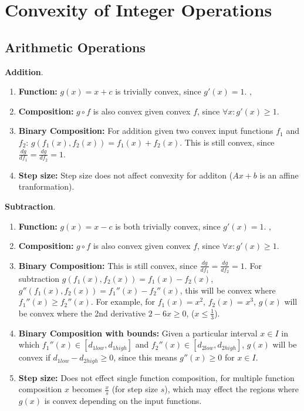 \documentclass[11pt]{article}
\theoremstyle{definition}
\begin{document}
\section{Convexity of Integer Operations}
\subsection{Arithmetic Operations}

\textbf{Addition}. 
\begin{enumerate}
\item \textbf{Function:} $g(x) = x + c$ is trivially convex, since $g'(x) = 1$. , 
\item \textbf{Composition:}  $g \circ f$ is also convex given convex $f$, since $\forall x: g'(x) \geq 1$.
\item \textbf{Binary Composition:} For addition given two convex input functions $f_1$ and $f_2$: $g(f_1(x), f_2(x)) = f_1(x) + f_2(x)$. This is still convex, since $\frac{dg}{df_1} = \frac{dg}{df_2} = 1$. 
\item \textbf{Step size:} Step size does not affect convexity for additon ($Ax + b$ is an affine tranformation).
\end{enumerate}

\textbf{Subtraction}. 
\begin{enumerate}
\item \textbf{Function:} $g(x) = x - c$ is both trivially convex, since $g'(x) = 1$. , 
\item \textbf{Composition:}  $g \circ f$ is also convex given convex $f$, since $\forall x: g'(x) \geq 1$.
\item \textbf{Binary Composition:} This is still convex, since $\frac{dg}{df_1} = \frac{dg}{df_2} = 1$. For subtraction $g(f_1(x), f_2(x)) = f_1(x) - f_2(x)$, $g''(f_1(x), f_2(x)) = f_1''(x) - f_2''(x)$, this will be convex where $f_1''(x) \geq f_2''(x)$. For example, for $f_1(x) = x^2$, $f_2(x) = x^3$, $g(x)$ will be convex where the 2nd derivative $2 - 6x \geq 0$, ($x \leq \frac{1}{3}$).
\item \textbf{Binary Composition with bounds:} Given a particular interval $x \in I$ in which $f_1''(x) \in [d_{1low}, d_{1high}]$ and $f_2''(x) \in [d_{2low}, d_{2high}]$, $g(x)$ will be convex if $d_{1low} - d_{2high} \geq 0$, since this means $g''(x) \geq 0$ for $x \in I$.
\item \textbf{Step size:} Does not effect single function composition, for multiple function composition $x$ becomes $\frac{x}{s}$ (for step size $s$), which may effect the regions where $g(x)$ is convex depending on the input functions.
\end{enumerate}
\end{document}
